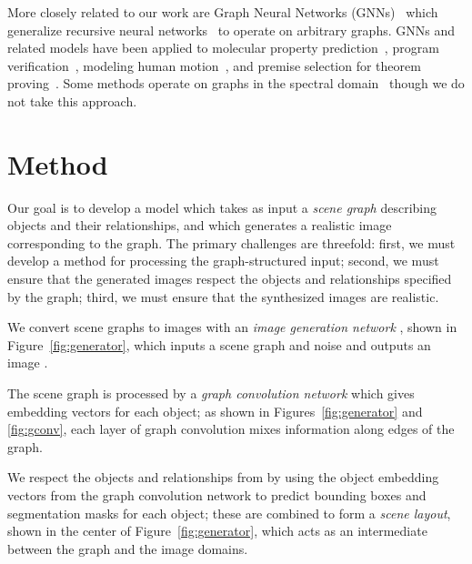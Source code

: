 \documentclass[10pt,twocolumn,letterpaper]{article}
\begin{document}
More closely related to our work are Graph Neural Networks (GNNs)~\cite{goller1996learning,gori2005new,scarselli2009graph} which generalize recursive neural networks~\cite{frasconi1998general,sperduti1997supervised,socher2011parsing} to operate on arbitrary graphs. GNNs and related models have been applied to molecular property prediction~\cite{duvenaud2015convolutional}, program verification~\cite{li2016gated}, modeling human motion~\cite{jain2016structural}, and premise selection for theorem proving~\cite{wang2017premise}. Some methods operate on graphs in the spectral domain~\cite{bruna2014spectral,henaff2015deep,kipf2017semi} though we do not take this approach.
 

\section{Method}
Our goal is to develop a model which takes as input a \emph{scene graph}
describing objects and their relationships, and which generates a realistic
image corresponding to the graph. The primary challenges are threefold: first,
we must develop a method for processing the graph-structured input; second, we
must ensure that the generated images respect the objects and relationships
specified by the graph; third, we must ensure that the synthesized images are realistic.

We convert scene graphs to images with an \emph{image generation network} ,
shown in Figure~\ref{fig:generator}, which inputs a scene graph  and noise
 and outputs an image .

The scene graph  is processed by a \emph{graph convolution network} which 
gives embedding vectors for each object; as shown in Figures~\ref{fig:generator}
and \ref{fig:gconv},
each layer of graph convolution mixes information along edges of the graph.

We respect the objects and relationships from  by using the object
embedding vectors from the graph convolution network to predict bounding boxes
and segmentation masks for each object; these are combined to form a \emph{scene layout},
shown in the center of Figure~\ref{fig:generator}, which acts as an intermediate between
the graph and the image domains.
\end{document}
